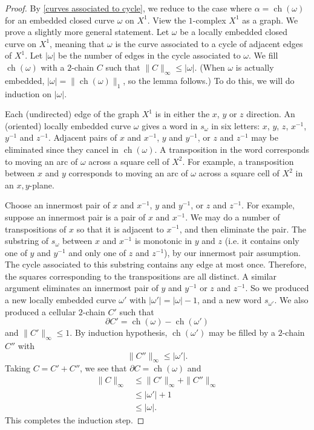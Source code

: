 \documentclass[12pt]{amsart}
\DeclareMathOperator*{\ch}{ch}
\theoremstyle{definition}
\begin{document}
\begin{proof} By \cref{curves associated to cycle}, we reduce to the case where $\alpha=\ch(\omega)$ for an embedded closed curve $\omega$ on $X^1$. View the $1$-complex $X^1$ as a graph. We prove a slightly more general statement. Let $\omega$ be a locally embedded closed curve on $X^1$, meaning that $\omega$ is the curve associated to a cycle of adjacent edges of $X^1$. Let $|\omega|$ be the number of edges in the cycle associated to $\omega$. We fill $\ch(\omega)$ with a $2$-chain $C$ such that $\|C\|_\infty\leq |\omega|$. (When $\omega$ is actually embedded, $|\omega|=\|\ch(\omega)\|_1$, so the lemma follows.) To do this, we will do induction on $|\omega|$.  

Each (undirected) edge of the graph $X^1$ is in either the $x$, $y$ or $z$ direction. An (oriented) locally embedded curve $\omega$ gives a word in $s_\omega$ in six letters: $x$, $y$, $z$, $x^{-1}$, $y^{-1}$ and $z^{-1}$. Adjacent pairs of $x$ and $x^{-1}$, $y$ and $y^{-1}$, or $z$ and $z^{-1}$ may be eliminated since they cancel in $\ch(\omega)$. A transposition in the word corresponds to moving an arc of $\omega$ across a square cell of $X^2$. For example, a transposition between $x$ and $y$ corresponds to moving an arc of $\omega$ across a square cell of $X^2$ in an $x,y$-plane. 

Choose an innermost pair of $x$ and $x^{-1}$, $y$ and $y^{-1}$, or $z$ and $z^{-1}$. For example, suppose an innermost pair is a pair of $x$ and $x^{-1}$. We may do a number of transpositions of $x$ so that it is adjacent to $x^{-1}$, and then eliminate the pair. The substring of $s_\omega$ between $x$ and $x^{-1}$ is monotonic in $y$ and $z$ (i.e. it contains only one of $y$ and $y^{-1}$ and only one of $z$ and $z^{-1}$), by our innermost pair assumption. The cycle associated to this substring contains any edge at most once. Therefore, the squares corresponding to the transpositions are all distinct. A similar argument eliminates an innermost pair of $y$ and $y^{-1}$ or $z$ and $z^{-1}$. So we produced a new locally embedded curve $\omega'$ with $|\omega'|=|\omega|-1$, and a new word $s_{\omega'}$. We also produced a cellular $2$-chain $C'$ such that $$\partial C'=\ch(\omega)-\ch(\omega')$$ and $\|C'\|_\infty\leq 1$. By induction hypothesis, $\ch(\omega')$ may be filled by a $2$-chain $C''$ with $$\|C''\|_\infty\leq |\omega'|.$$ Taking $C=C'+C''$, we see that $\partial C=\ch(\omega)$ and 
\begin{align*}\|C\|_\infty &\leq \|C'\|_\infty+\|C''\|_\infty \\&\leq|\omega'|+1\\&\leq |\omega|.
\end{align*} This completes the induction step.
\end{proof}
\end{document}
